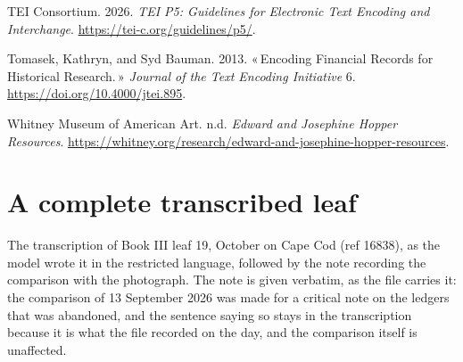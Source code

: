 \documentclass[11pt]{article}
\newcommand{\q}[1]{«\,#1\,»}
\begin{document}
\begin{list}{}{\setlength{\leftmargin}{1.5em}\setlength{\itemindent}{-1.5em}\setlength{\itemsep}{3pt}}
\item TEI Consortium. 2026. \emph{TEI P5: Guidelines for Electronic Text Encoding and Interchange}. \url{https://tei-c.org/guidelines/p5/}.
\item Tomasek, Kathryn, and Syd Bauman. 2013. \q{Encoding Financial Records for Historical Research.} \emph{Journal of the Text Encoding Initiative} 6. \url{https://doi.org/10.4000/jtei.895}.
\item Whitney Museum of American Art. n.d. \emph{Edward and Josephine Hopper Resources}. \url{https://whitney.org/research/edward-and-josephine-hopper-resources}.
\end{list}

\appendix
\section{A complete transcribed leaf}

The transcription of Book III leaf 19, October on Cape Cod (ref 16838), as the model wrote it in the restricted language, followed by the note recording the comparison with the photograph. The note is given verbatim, as the file carries it: the comparison of 13 September 2026 was made for a critical note on the ledgers that was abandoned, and the sentence saying so stays in the transcription because it is what the file recorded on the day, and the comparison itself is unaffected.
\end{document}
